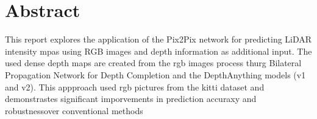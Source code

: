 \section*{Abstract}
This report explores the application of the Pix2Pix network for predicting LiDAR intensity mpas using RGB images and depth information as additional input. The used dense depth maps are created from the rgb images process thurg Bilateral Propagation Network for Depth Completion and the DepthAnything models (v1 and v2). This appproach used rgb pictures from the kitti dataset and demonstrastes significant imporvements in prediction accuraxy and robustnessover conventional methods
